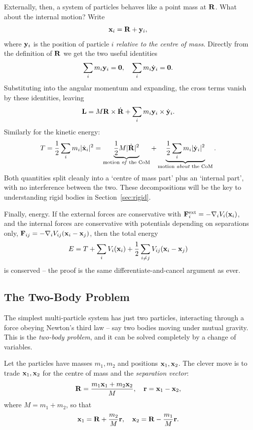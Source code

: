 \documentclass[a4paper]{scrartcl}
\begin{document}
Externally, then, a system of particles behaves like a point mass at $\mathbf{R}$. What about the internal motion? Write
$$
\mathbf{x}_i = \mathbf{R} + \mathbf{y}_i,
$$
where $\mathbf{y}_i$ is the position of particle $i$ \emph{relative to the centre of mass}. Directly from the definition of $\mathbf{R}$ we get the two useful identities
$$
\sum_i m_i \mathbf{y}_i = \mathbf{0}, \quad \sum_i m_i \dot{\mathbf{y}}_i = \mathbf{0}.
$$
Substituting into the angular momentum and expanding, the cross terms vanish by these identities, leaving
$$
\mathbf{L} = M \mathbf{R} \times \dot{\mathbf{R}} + \sum_i m_i \mathbf{y}_i \times \dot{\mathbf{y}}_i.
$$
Similarly for the kinetic energy:
$$
T = \frac{1}{2}\sum_i m_i |\dot{\mathbf{x}}_i|^2 = \underbrace{\frac{1}{2}M |\dot{\mathbf{R}}|^2}_{\text{motion \emph{of} the CoM}} + \underbrace{\frac{1}{2}\sum_i m_i |\dot{\mathbf{y}}_i|^2}_{\text{motion \emph{about} the CoM}}.
$$
Both quantities split cleanly into a `centre of mass part' plus an `internal part', with no interference between the two. These decompositions will be the key to understanding rigid bodies in Section~\ref{sec:rigid}.

Finally, energy. If the external forces are conservative with $\mathbf{F}_i^{\text{ext}} = -\nabla_i V_i(\mathbf{x}_i)$, and the internal forces are conservative with potentials depending on separations only, $\mathbf{F}_{ij} = -\nabla_i V_{ij}(\mathbf{x}_i - \mathbf{x}_j)$, then the total energy
$$
E = T + \sum_i V_i(\mathbf{x}_i) + \frac{1}{2}\sum_{i \neq j} V_{ij}(\mathbf{x}_i - \mathbf{x}_j)
$$
is conserved -- the proof is the same differentiate-and-cancel argument as ever.

\subsection{The Two-Body Problem}

The simplest multi-particle system has just two particles, interacting through a force obeying Newton's third law -- say two bodies moving under mutual gravity. This is the \emph{two-body problem}, and it can be solved completely by a change of variables.

Let the particles have masses $m_1, m_2$ and positions $\mathbf{x}_1, \mathbf{x}_2$. The clever move is to trade $\mathbf{x}_1, \mathbf{x}_2$ for the centre of mass and the \emph{separation vector}:
$$
\mathbf{R} = \frac{m_1 \mathbf{x}_1 + m_2 \mathbf{x}_2}{M}, \quad \mathbf{r} = \mathbf{x}_1 - \mathbf{x}_2,
$$
where $M = m_1 + m_2$, so that
$$
\mathbf{x}_1 = \mathbf{R} + \frac{m_2}{M} \mathbf{r}, \quad \mathbf{x}_2 = \mathbf{R} - \frac{m_1}{M}\mathbf{r}.
$$

\begin{center}
\end{center}
\end{document}
